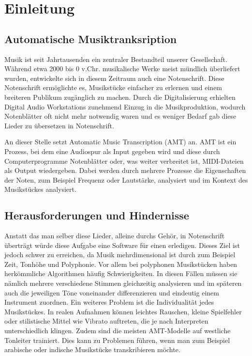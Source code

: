 \section{Einleitung}
\subsection{Automatische Musiktranksription}
Musik ist seit Jahrtausenden ein zentraler Bestandteil unserer Gesellschaft.
Während etwa 2000 bis 0 v.Chr. musikalische Werke meist mündlich überliefert wurden,
entwickelte sich in diesem Zeitraum auch eine Notenschrift.
Diese Notenschrift ermöglichte es, Musikstücke einfacher zu erlernen und einem breiteren Publikum zugänglich zu machen.
Durch die Digitalisierung erhielten Digital Audio Workstations zunehmend Einzug in die Musikproduktion,
wodurch Notenblätter oft nicht mehr notwendig waren und es weniger Bedarf gab diese Lieder zu übersetzen in Notenschrift.

An dieser Stelle setzt Automatic Music Transcription (AMT) an.
AMT ist ein Prozess, bei dem eine Audiospur als Input gegeben wird und diese durch Computerprogramme
Notenblätter oder, was weiter verbreitet ist, MIDI-Dateien als Output wiedergeben.
Dabei werden durch mehrere Prozesse die Eigenschaften der Noten, zum Beispiel Frequenz oder Lautstärke,
analysiert und im Kontext des Musikstückes analysiert.

\subsection{Herausforderungen und Hindernisse}
Anstatt das man selber diese Lieder, alleine durchs Gehör,
in Notenschrift überträgt würde diese Aufgabe eine Software für einen erledigen.
Dieses Ziel ist jedoch schwer zu erreichen,
da Musik mehrdimensional ist durch zum Beispiel Zeit, Tonhöhe und Polyphonie.
Vor allem bei polyphonen Musikstücken haben herkömmliche Algorithmen häufig Schwierigkeiten.
In diesen Fällen müssen sie nämlich mehrere verschiedene Stimmen gleichzeitig analysieren und
im späteren auch die jeweiligen Töne voneinander differenzieren und eindeutig einem Instrument zuordnen.
Ein weiteres Problem ist die Individualität jedes Musikstückes.
In realen Aufnahmen können leichtes Rauschen,
kleine Spielfehler oder stilistische Mittel wie Vibrato auftreten,
die je nach Interpreten unterschiedlich klingen.
Zudem sind die meisten AMT-Modelle auf westliche Tonleiter trainiert.
Dies kann zu Problemen führen, wenn man zum Beispiel
arabische oder indische Musikstücke transkribieren möchte.

